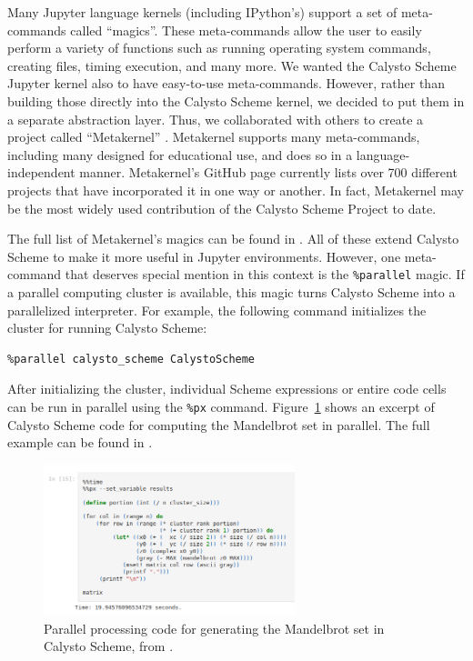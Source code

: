 \documentclass[acmsmall,screen,authorversion]{acmart}
\begin{document}
Many Jupyter language kernels (including IPython's) support a set of
meta-commands called ``magics''. These meta-commands allow the user to easily
perform a variety of functions such as running operating system commands,
creating files, timing execution, and many more. We wanted the Calysto Scheme
Jupyter kernel also to have easy-to-use meta-commands. However, rather than
building those directly into the Calysto Scheme kernel, we decided to put them
in a separate abstraction layer. Thus, we collaborated with others to create a
project called ``Metakernel'' \cite{Metakernel}. Metakernel supports many
meta-commands, including many designed for educational use, and does so in a
language-independent manner. Metakernel's GitHub page currently lists over 700
different projects that have incorporated it in one way or another. In fact,
Metakernel may be the most widely used contribution of the Calysto Scheme
Project to date.

The full list of Metakernel's magics can be found in
\cite{MetakernelMagics}. All of these extend Calysto Scheme to make it more
useful in Jupyter environments. However, one meta-command that deserves special
mention in this context is the \texttt{\%parallel} magic. If a parallel
computing cluster is available, this magic turns Calysto Scheme into a
parallelized interpreter. For example, the following command initializes the
cluster for running Calysto Scheme:

{\small
\begin{verbatim}
%parallel calysto_scheme CalystoScheme
\end{verbatim}
}

After initializing the cluster, individual Scheme expressions or entire code
cells can be run in parallel using the \texttt{\%px}
command. Figure~\ref{fig:parallelized-scheme} shows an excerpt of Calysto
Scheme code for computing the Mandelbrot set in parallel. The full example
can be found in \cite{ParallelProcessingWithMetakernel}.


\begin{figure}[h]
  \centering
  \includegraphics[width=0.65\textwidth]{parallel-scheme.png}
  \caption{Parallel processing code for generating the Mandelbrot set in
    Calysto Scheme, from \cite{ParallelProcessingWithMetakernel}.}
  \label{fig:parallelized-scheme}
\end{figure}
\end{document}
